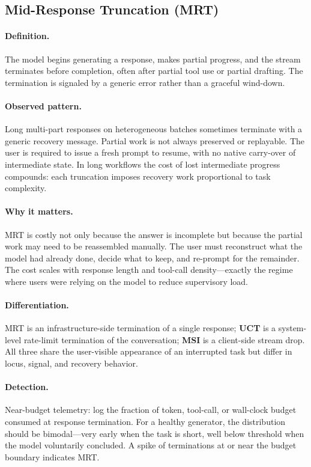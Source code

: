 \documentclass[11pt]{article}
\begin{document}
\subsection{Mid-Response Truncation (MRT)}
\paragraph{Definition.} The model begins generating a response, makes partial progress, and the stream terminates before completion, often after partial tool use or partial drafting. The termination is signaled by a generic error rather than a graceful wind-down.

\paragraph{Observed pattern.} Long multi-part responses on heterogeneous batches sometimes terminate with a generic recovery message. Partial work is not always preserved or replayable. The user is required to issue a fresh prompt to resume, with no native carry-over of intermediate state. In long workflows the cost of lost intermediate progress compounds: each truncation imposes recovery work proportional to task complexity.

\paragraph{Why it matters.} MRT is costly not only because the answer is incomplete but because the partial work may need to be reassembled manually. The user must reconstruct what the model had already done, decide what to keep, and re-prompt for the remainder. The cost scales with response length and tool-call density---exactly the regime where users were relying on the model to reduce supervisory load.

\paragraph{Differentiation.} MRT is an infrastructure-side termination of a single response; \textbf{UCT} is a system-level rate-limit termination of the conversation; \textbf{MSI} is a client-side stream drop. All three share the user-visible appearance of an interrupted task but differ in locus, signal, and recovery behavior.

\paragraph{Detection.} Near-budget telemetry: log the fraction of token, tool-call, or wall-clock budget consumed at response termination. For a healthy generator, the distribution should be bimodal---very early when the task is short, well below threshold when the model voluntarily concluded. A spike of terminations at or near the budget boundary indicates MRT.
\end{document}
